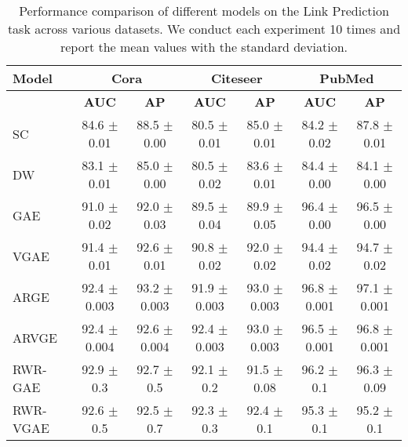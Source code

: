 \documentclass{article}
\begin{document}
\begin{table*}[t]
\begin{center}
\begin{tabular}{lcccccc}
\toprule
{\bf Model}&\multicolumn{2}{c}{\bf Cora }&\multicolumn{2}{c}{\bf Citeseer} &\multicolumn{2}{c}{\bf PubMed}\\
\midrule
& \bf AUC & \bf AP & \bf AUC & \bf AP & \bf AUC & \bf AP \\
\midrule
SC & 84.6  $\pm$  0.01 & 88.5  $\pm$  0.00 & 80.5  $\pm$  0.01 & 85.0  $\pm$  0.01 & 84.2  $\pm$  0.02 & 87.8  $\pm$  0.01\\
DW & 83.1 $\pm$  0.01 & 85.0  $\pm$  0.00 & 80.5  $\pm$  0.02 & 83.6  $\pm$  0.01 & 84.4  $\pm$  0.00 & 84.1  $\pm$  0.00\\
GAE & 91.0 $\pm$  0.02 & 92.0  $\pm$  0.03 & 89.5  $\pm$  0.04 & 89.9  $\pm$  0.05 & 96.4  $\pm$  0.00 & 96.5  $\pm$  0.00\\
VGAE & 91.4 $\pm$  0.01 & 92.6  $\pm$  0.01 & 90.8  $\pm$  0.02 & 92.0  $\pm$  0.02 & 94.4  $\pm$  0.02 & 94.7  $\pm$  0.02\\
ARGE & 92.4  $\pm$  0.003 & 93.2  $\pm$  0.003 & 91.9  $\pm$  0.003 & 93.0 $\pm$  0.003 & 96.8  $\pm$  0.001 & 97.1  $\pm$  0.001\\
ARVGE & 92.4  $\pm$  0.004 & 92.6  $\pm$  0.004 & 92.4  $\pm$  0.003 & 93.0  $\pm$  0.003 & 96.5 $\pm$  0.001 & 96.8 $\pm$  0.001\\
\midrule
RWR-GAE & 92.9 $\pm$ 0.3 & 92.7 $\pm$ 0.5 & 92.1 $\pm$ 0.2 & 91.5 $\pm$ 0.08 & 96.2 $\pm$ 0.1 & 96.3 $\pm$ 0.09\\
RWR-VGAE & 92.6 $\pm$ 0.5 & 92.5 $\pm$ 0.7 & 92.3 $\pm$ 0.3 & 92.4 $\pm$ 0.1& 95.3 $\pm$ 0.1 & 95.2 $\pm$ 0.1\\
\bottomrule
\end{tabular}
\end{center}
\caption{Performance comparison of different models on the Link Prediction task across various datasets. We conduct each experiment 10 times and report the mean values with the standard deviation.}
\label{results:lp}
\end{table*}
\end{document}
